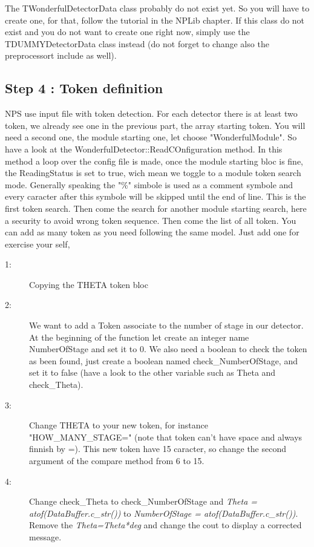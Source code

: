 \documentclass{book}
\begin{document}
	The TWonderfulDetectorData class probably do not exist yet. 
	So you will have to create one, for that, follow the tutorial in the NPLib chapter. 
	If this class do not exist and you do not want to create one right now, simply use the TDUMMYDetectorData class instead (do not forget to change also the preprocessort include as well).

	\subsection{Step 4 : Token definition}
		NPS use input file with token detection. 
		For each detector there is at least two token, we already see one in the previous part, the array starting token. 
		You will need a second one, the module starting one, let choose "WonderfulModule". 
		So have a look at the WonderfulDetector::ReadCOnfiguration method. 
		In this method a loop over the config file is made, once the module starting bloc is fine, the ReadingStatus is set to true, wich mean we toggle to a module token search mode. 
		Generally speaking the "\%" simbole is used as a comment symbole and every caracter after this symbole will be skipped until the end of line. 
		This is the first token search. 
		Then come the search for another module starting search, here a security to avoid wrong token sequence. 
		Then come the list of all token. 
		You can add as many token as you need following the same model. 
		Just add one for exercise your self,

		\begin{description}
			\item[1:] Copying the THETA token bloc
			\item[2:] We want to add a Token associate to the number of stage in our detector. At the beginning of the function let create an integer name NumberOfStage and set it to 0. We also need a boolean to check the token as been found, just create a boolean named check\_NumberOfStage, and set it to false (have a look to the other variable such as Theta and check\_Theta).
			\item[3:] Change THETA to your new token, for instance "HOW\_MANY\_STAGE=" (note that token can't have space and always finnish by =). This new token have 15 caracter, so change the second argument of the compare method from 6 to 15.
			\item[4:] Change check\_Theta to check\_NumberOfStage and \emph{Theta = atof(DataBuffer.c\_str())} to \emph{NumberOfStage = atof(DataBuffer.c\_str())}. Remove the \emph{Theta=Theta*deg} and change the cout to display a corrected message.
		\end{description}
\end{document}
